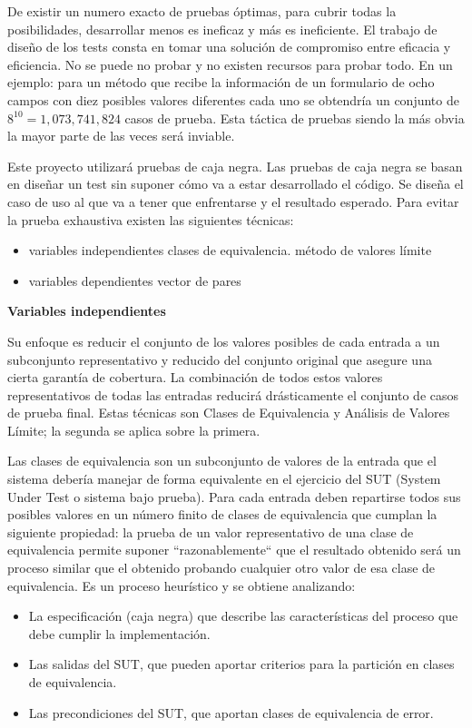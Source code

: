 De existir un numero exacto de pruebas óptimas, para cubrir todas la posibilidades, desarrollar menos es ineficaz y más es ineficiente.
El trabajo de diseño de los tests consta en tomar una solución de compromiso entre eficacia y eficiencia.
No se puede no probar y no existen recursos para probar todo.
En un ejemplo: para un método que recibe la información de un formulario de ocho campos con diez posibles valores diferentes cada uno se obtendría un conjunto de $8^{10} = 1,073,741,824$ casos de prueba.
Esta táctica de pruebas siendo la más obvia la mayor parte de las veces será inviable.

Este proyecto utilizará pruebas de caja negra.
Las pruebas de caja negra se basan en diseñar un test sin suponer cómo va a estar desarrollado el código.
Se diseña el caso de uso al que va a tener que enfrentarse y el resultado esperado.
Para evitar la prueba exhaustiva existen las siguientes técnicas:

\begin{itemize}
    \item variables independientes
    \subitem clases de equivalencia.
    \subitem método de valores límite
    \item variables dependientes
    \subitem vector de pares
\end{itemize}

\textbf{Variables independientes}

Su enfoque es reducir el conjunto de los valores posibles de cada entrada a un subconjunto representativo y reducido del conjunto original que asegure una cierta garantía de cobertura.
La combinación de todos estos valores representativos de todas las entradas reducirá drásticamente el conjunto de casos de prueba final.
Estas técnicas son Clases de Equivalencia y Análisis de Valores Límite;
la segunda se aplica sobre la primera.

Las clases de equivalencia son un subconjunto de valores de la entrada que el sistema debería manejar de forma equivalente en el ejercicio del \gls{SUT} (System Under Test o sistema bajo prueba).
Para cada entrada deben repartirse todos sus posibles valores en un número finito de clases de equivalencia que cumplan la siguiente propiedad: la prueba de un valor representativo de una clase de equivalencia permite suponer “razonablemente“ que el resultado obtenido será un proceso similar que el obtenido probando cualquier otro valor de esa clase de equivalencia.
Es un proceso heurístico y se obtiene analizando:
\begin{itemize}
    \item La especificación (caja negra) que describe las características del proceso que debe cumplir la implementación.
    \item Las salidas del SUT, que pueden aportar criterios para la partición en clases de equivalencia.
    \item Las precondiciones del SUT, que aportan clases de equivalencia de error.
\end{itemize}

